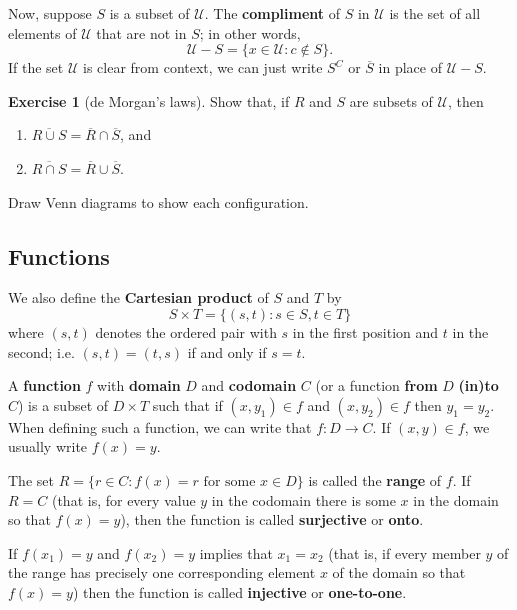 \documentclass[a4paper,leqno]{article}
\numberwithin{equation}{section}
\theoremstyle{definition}
\newtheorem{exercise}[equation]{Exercise}
\theoremstyle{remark}
\newcommand{\df}[1]{\textbf{#1}}
\begin{document}
Now, suppose $ S $ is a subset of $ \mathcal{U} $. The \df{compliment} of $ S $ in $ \mathcal{U} $ is the set of
all elements of $ \mathcal{U} $ that are not in $ S $; in other words,
\begin{equation}
  \mathcal{U} - S = \{ x \in \mathcal{U} : c \notin S\}.
\end{equation}
If the set $ \mathcal{U} $ is clear from context, we can just write $ S^C $ or $ \overline{S} $ in place of $ \mathcal{U} - S $.

\begin{exercise}[de Morgan's laws]
  Show that, if $ R $ and $ S $ are subsets of $ \mathcal{U} $, then
  \begin{enumerate}
    \item $ \overline{R \cup S} = \overline{R} \cap \overline{S} $, and
    \item $ \overline{R \cap S} = \overline{R} \cup \overline{S} $.
  \end{enumerate}
  Draw Venn diagrams to show each configuration.
\end{exercise}

\subsection{Functions}
We also define the \df{Cartesian product} of $ S $ and $ T $ by
\begin{equation}
  S \times T = \{(s,t) : s \in S, t \in T\}
\end{equation}
where $ (s,t) $ denotes the ordered pair with $ s $ in the first position and $ t $ in the second; i.e. $ (s,t) = (t,s) $ if and only if $ s = t $.

A \df{function} $ f $ with \df{domain} $ D $ and \df{codomain} $ C $ (or a function \df{from} $ D $ \df{(in)to} $ C $) is a subset
of $ D \times T $ such that if $ (x,y_1) \in f $ and $ (x, y_2) \in f $ then $ y_1 = y_2 $. When defining such a function, we can
write that $ f : D \to C $. If $ (x,y) \in f $, we usually write $ f(x) = y $.

The set $ R = \{r \in C : f(x) = r \text{ for some } x \in D\} $ is called the \df{range} of $ f $. If $ R = C $ (that is, for every value $ y $
in the codomain there is some $ x $ in the domain so that $ f(x) = y $), then the function is called \df{surjective} or \df{onto}.

If $ f(x_1) = y $ and $ f(x_2) = y $ implies that $ x_1 = x_2 $ (that is, if every member $ y $ of the range has precisely one corresponding
element $ x $ of the domain so that $ f(x) = y $) then the function is called \df{injective} or \df{one-to-one}.
\end{document}
